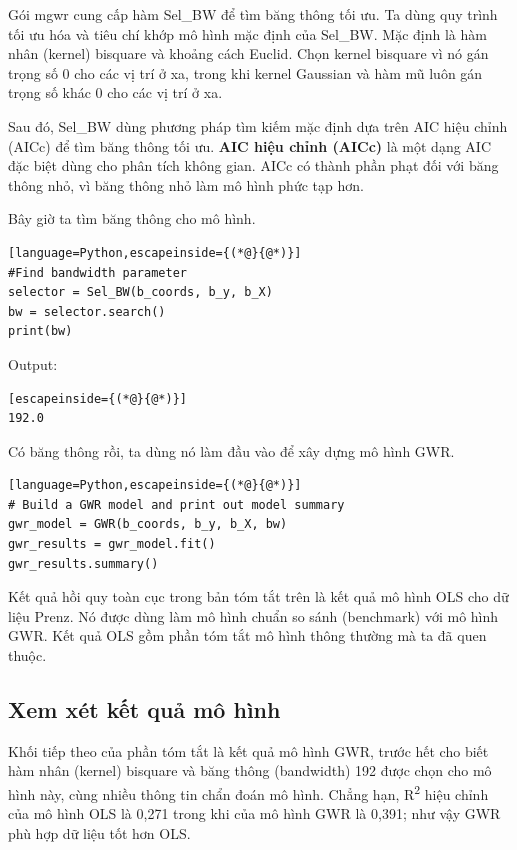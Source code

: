 Gói mgwr cung cấp hàm Sel\_BW để tìm băng thông tối ưu. Ta dùng quy trình tối ưu hóa và tiêu chí khớp mô hình mặc định của Sel\_BW. Mặc định là hàm nhân (kernel) bisquare và khoảng cách Euclid. Chọn kernel bisquare vì nó gán trọng số 0 cho các vị trí ở xa, trong khi kernel Gaussian và hàm mũ luôn gán trọng số khác 0 cho các vị trí ở xa.

Sau đó, Sel\_BW dùng phương pháp tìm kiếm mặc định dựa trên AIC hiệu chỉnh (AICc) để tìm băng thông tối ưu. \textbf{AIC hiệu chỉnh (AICc)} là một dạng AIC đặc biệt dùng cho phân tích không gian. AICc có thành phần phạt đối với băng thông nhỏ, vì băng thông nhỏ làm mô hình phức tạp hơn.

Bây giờ ta tìm băng thông cho mô hình.

\begin{lstlisting}[language=Python,escapeinside={(*@}{@*)}]
#Find bandwidth parameter
selector = Sel_BW(b_coords, b_y, b_X)
bw = selector.search()
print(bw)
\end{lstlisting}

Output:

\begin{lstlisting}[escapeinside={(*@}{@*)}]
192.0
\end{lstlisting}

Có băng thông rồi, ta dùng nó làm đầu vào để xây dựng mô hình GWR.

\begin{lstlisting}[language=Python,escapeinside={(*@}{@*)}]
# Build a GWR model and print out model summary
gwr_model = GWR(b_coords, b_y, b_X, bw)
gwr_results = gwr_model.fit()
gwr_results.summary()
\end{lstlisting}

Kết quả hồi quy toàn cục trong bản tóm tắt trên là kết quả mô hình OLS cho dữ liệu Prenz. Nó được dùng làm mô hình chuẩn so sánh (benchmark) với mô hình GWR. Kết quả OLS gồm phần tóm tắt mô hình thông thường mà ta đã quen thuộc.

\subsection{Xem xét kết quả mô hình}

Khối tiếp theo của phần tóm tắt là kết quả mô hình GWR, trước hết cho biết hàm nhân (kernel) bisquare và băng thông (bandwidth) 192 được chọn cho mô hình này, cùng nhiều thông tin chẩn đoán mô hình. Chẳng hạn, R\textsuperscript{2} hiệu chỉnh của mô hình OLS là 0,271 trong khi của mô hình GWR là 0,391; như vậy GWR phù hợp dữ liệu tốt hơn OLS.

